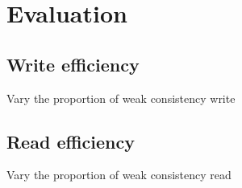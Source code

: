 \section{Evaluation}
\label{sec:eval}


\subsection{Write efficiency}
Vary the proportion of weak consistency write



\subsection{Read efficiency}
Vary the proportion of weak consistency read



